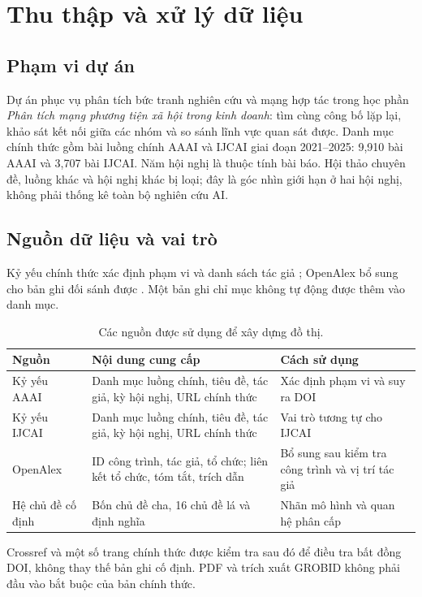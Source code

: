 \chapter{Thu thập và xử lý dữ liệu}
\label{ch:data}
\section{Phạm vi dự án}
Dự án phục vụ phân tích bức tranh nghiên cứu và mạng hợp tác trong học phần
\emph{Phân tích mạng phương tiện xã hội trong kinh doanh}: tìm cùng công bố
lặp lại, khảo sát kết nối giữa các nhóm và so sánh lĩnh vực quan sát được.
Danh mục chính thức gồm \Papers{} bài luồng chính AAAI và IJCAI
giai đoạn 2021--2025: 9,910 bài AAAI và 3,707 bài IJCAI. Năm hội nghị là thuộc
tính bài báo. Hội thảo chuyên đề, luồng khác và hội nghị khác bị loại; đây là
góc nhìn giới hạn ở hai hội nghị, không phải thống kê toàn bộ nghiên cứu AI.

\section{Nguồn dữ liệu và vai trò}
Kỷ yếu chính thức xác định phạm vi và danh sách tác giả
\citep{aaaiProceedings,ijcaiProceedings}; OpenAlex bổ sung cho bản ghi đối sánh
được \citep{openalexworks}. Một bản ghi chỉ mục không tự động được thêm vào danh mục.

\begin{table}[!htbp]\centering\small
\caption{Các nguồn được sử dụng để xây dựng đồ thị.}\label{tab:sources}
\begin{tabularx}{\textwidth}{>{\raggedright\arraybackslash}p{2.8cm}YY}\toprule
Nguồn & Nội dung cung cấp & Cách sử dụng\\\midrule
Kỷ yếu AAAI & Danh mục luồng chính, tiêu đề, tác giả, kỳ hội nghị, URL chính thức & Xác định phạm vi và suy ra DOI\\
Kỷ yếu IJCAI & Danh mục luồng chính, tiêu đề, tác giả, kỳ hội nghị, URL chính thức & Vai trò tương tự cho IJCAI\\
OpenAlex & ID công trình, tác giả, tổ chức; liên kết tổ chức, tóm tắt, trích dẫn & Bổ sung sau kiểm tra công trình và vị trí tác giả\\
Hệ chủ đề cố định & Bốn chủ đề cha, 16 chủ đề lá và định nghĩa & Nhãn mô hình và quan hệ phân cấp\\\bottomrule
\end{tabularx}\end{table}

Crossref và một số trang chính thức được kiểm tra sau đó để điều tra bất đồng
DOI, không thay thế bản ghi cố định. PDF và trích xuất GROBID không phải đầu
vào bắt buộc của bản chính thức.


